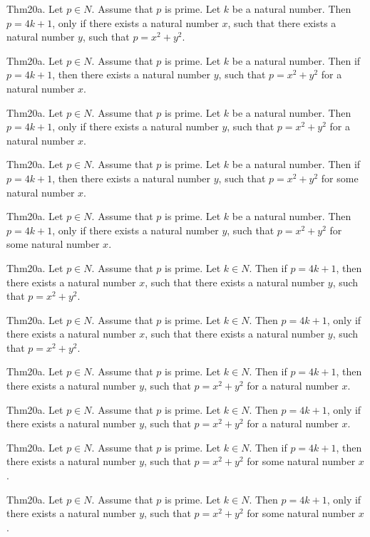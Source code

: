 \documentclass{article}
\begin{document}
Thm20a. Let $p \in N$. Assume that $p$ is prime. Let $k$ be a natural number. Then $p = 4 k + 1$, only if there exists a natural number $x$, such that there exists a natural number $y$, such that $p = x ^{ 2}+ y ^{ 2}$.

Thm20a. Let $p \in N$. Assume that $p$ is prime. Let $k$ be a natural number. Then if $p = 4 k + 1$, then there exists a natural number $y$, such that $p = x ^{ 2}+ y ^{ 2}$ for a natural number $x$.

Thm20a. Let $p \in N$. Assume that $p$ is prime. Let $k$ be a natural number. Then $p = 4 k + 1$, only if there exists a natural number $y$, such that $p = x ^{ 2}+ y ^{ 2}$ for a natural number $x$.

Thm20a. Let $p \in N$. Assume that $p$ is prime. Let $k$ be a natural number. Then if $p = 4 k + 1$, then there exists a natural number $y$, such that $p = x ^{ 2}+ y ^{ 2}$ for some natural number $x$.

Thm20a. Let $p \in N$. Assume that $p$ is prime. Let $k$ be a natural number. Then $p = 4 k + 1$, only if there exists a natural number $y$, such that $p = x ^{ 2}+ y ^{ 2}$ for some natural number $x$.

Thm20a. Let $p \in N$. Assume that $p$ is prime. Let $k \in N$. Then if $p = 4 k + 1$, then there exists a natural number $x$, such that there exists a natural number $y$, such that $p = x ^{ 2}+ y ^{ 2}$.

Thm20a. Let $p \in N$. Assume that $p$ is prime. Let $k \in N$. Then $p = 4 k + 1$, only if there exists a natural number $x$, such that there exists a natural number $y$, such that $p = x ^{ 2}+ y ^{ 2}$.

Thm20a. Let $p \in N$. Assume that $p$ is prime. Let $k \in N$. Then if $p = 4 k + 1$, then there exists a natural number $y$, such that $p = x ^{ 2}+ y ^{ 2}$ for a natural number $x$.

Thm20a. Let $p \in N$. Assume that $p$ is prime. Let $k \in N$. Then $p = 4 k + 1$, only if there exists a natural number $y$, such that $p = x ^{ 2}+ y ^{ 2}$ for a natural number $x$.

Thm20a. Let $p \in N$. Assume that $p$ is prime. Let $k \in N$. Then if $p = 4 k + 1$, then there exists a natural number $y$, such that $p = x ^{ 2}+ y ^{ 2}$ for some natural number $x$.

Thm20a. Let $p \in N$. Assume that $p$ is prime. Let $k \in N$. Then $p = 4 k + 1$, only if there exists a natural number $y$, such that $p = x ^{ 2}+ y ^{ 2}$ for some natural number $x$.
\end{document}
